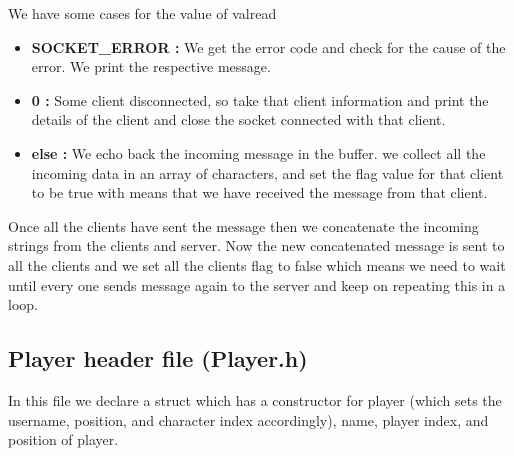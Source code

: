 \documentclass{article}
\begin{document}
We have some cases for the value of valread \\
\begin{itemize}
    \item \textbf{SOCKET\_ERROR :} We get the error code and check for the cause of the error. We print the respective message. \\
    \item \textbf{0 :} Some client disconnected, so take that client information and print the details of the client and close the socket connected with that client. \\
    \item \textbf{else :} We echo back the incoming message in the buffer. we collect all the incoming data in an array of characters, and set the flag value for that client to be true with means that we have received the message from that client. \\
\end{itemize}

Once all the clients have sent the message then we concatenate the incoming strings from the clients and server. Now the new concatenated message is sent to all the clients and we set all the clients flag to false which means we need to wait until every one sends message again to the server and keep on repeating this in a loop.

\subsection{Player header file (Player.h)}
In this file we declare a struct which has a constructor for player (which sets the username, position, and character index accordingly), name, player index, and position of player. 
\newline

\vspace{300px}
\end{document}
